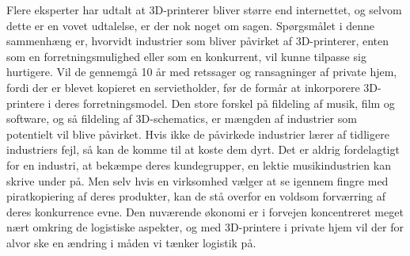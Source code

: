 Flere eksperter har udtalt at 3D-printerer bliver større end internettet\cite{musik5}, og selvom dette er en vovet udtalelse, er der nok noget om sagen. Spørgsmålet i denne sammenhæng er, hvorvidt industrier som bliver påvirket af 3D-printerer, enten som en forretningsmulighed eller som en konkurrent, vil kunne tilpasse sig hurtigere. Vil de gennemgå 10 år med retssager og ransagninger af private hjem, fordi der er blevet kopieret en servietholder, før de formår at inkorporere 3D-printere i deres forretningsmodel.
Den store forskel på fildeling af musik, film og software, og så fildeling af 3D-schematics, er mængden af industrier som potentielt vil blive påvirket. Hvis ikke de påvirkede industrier lærer af tidligere industriers fejl, så kan de komme til at koste dem dyrt. Det er aldrig fordelagtigt for en industri, at bekæmpe deres kundegrupper, en lektie musikindustrien kan skrive under på. Men selv hvis en virksomhed vælger at se igennem fingre med piratkopiering af deres produkter, kan de stå overfor en voldsom forværring af deres konkurrence evne.
Den nuværende økonomi er i forvejen koncentreret meget nært omkring de logistiske aspekter, og med 3D-printere i private hjem vil der for alvor ske en ændring i måden vi tænker logistik på.
